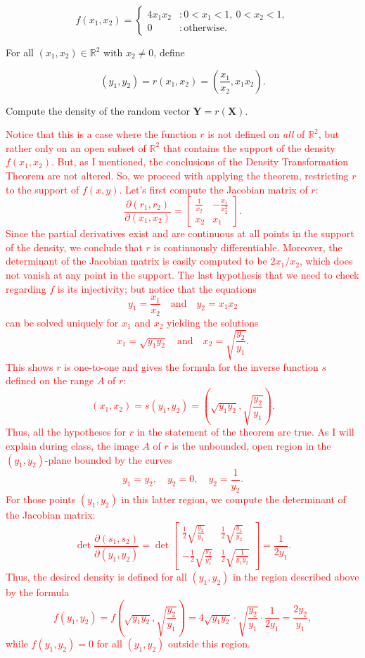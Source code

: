\documentclass[12pt,reqno]{amsart}
\begin{document}
	\[
	f(x_1,x_2) = \begin{cases}
	4x_1x_2 & : 0 < x_1 < 1, \ 0 < x_2 < 1, \\
	0 & : \text{otherwise}.
	\end{cases}
	\]

For all $(x_1,x_2) \in \mathbb{R}^2$ with $x_2 \neq 0$, define

	\[(y_1,y_2) = r(x_1,x_2) = \left( \frac{x_1}{x_2}, x_1x_2 \right).
	\]
	
Compute the density of the random vector $\mathbf{Y} = r(\mathbf{X})$.

\bigskip
\textcolor{red}{Notice that this is a case where the function $r$ is not defined on \textit{all} of $\mathbb{R}^2$, but rather only on an open subset of $\mathbb{R}^2$ that contains the support of the density $f(x_1,x_2)$. But, as I mentioned, the conclusions of the Density Transformation Theorem are not altered. So, we proceed with applying the theorem, restricting $r$ to the support of $f(x,y)$. Let's first compute the Jacobian matrix of $r$:
	\[\frac{\partial(r_1,r_2)}{\partial(x_1,x_2)} = \begin{bmatrix} \frac{1}{x_2} & - \frac{x_1}{x_2^2} \\ x_2 & x_1 \end{bmatrix}.
	\]
Since the partial derivatives exist and are continuous at all points in the support of the density, we conclude that $r$ is continuously differentiable. Moreover, the determinant of the Jacobian matrix is easily computed to be $2x_1/x_2$, which does not vanish at any point in the support. The last hypothesis that we need to check regarding $f$ is its injectivity; but notice that the equations
	\[y_1 = \frac{x_1}{x_2} \quad \text{and} \quad y_2 = x_1 x_2
	\]
can be solved uniquely for $x_1$ and $x_2$ yielding the solutions
	\[x_1 = \sqrt{y_1y_2} \quad \text{and} \quad x_2 = \sqrt{ \frac{y_2}{y_1}}.
	\]
This shows $r$ is one-to-one and gives the formula for the inverse function $s$ defined on the range $A$ of $r$:
	\[(x_1,x_2) = s(y_1,y_2) = \left( \sqrt{y_1y_2}, \sqrt{ \frac{y_2}{y_1}}\right).
	\]
Thus, all the hypotheses for $r$ in the statement of the theorem are true. As I will explain during class, the image $A$ of $r$ is the unbounded, open region in the $(y_1,y_2)$-plane bounded by the curves
	\[y_1 = y_2, \quad y_2 = 0, \quad y_2 = \frac{1}{y_2}.
	\]
For those points $(y_1,y_2)$ in this latter region, we compute the determinant of the Jacobian matrix:
	\[\det\frac{\partial(s_1,s_2)}{\partial (y_1,y_2)} = \det\begin{bmatrix}
	\frac{1}{2} \sqrt{\frac{y_2}{y_1}} & \frac{1}{2} \sqrt{\frac{y_1}{y_2}} \\
	-\frac{1}{2} \sqrt{ \frac{y_2}{y_1^3}} & \frac{1}{2} \sqrt{\frac{1}{y_1y_2}}
	\end{bmatrix} = \frac{1}{2y_1}.
	\]
Thus, the desired density is defined for all $(y_1,y_2)$ in the region described above by the formula
	\[f(y_1,y_2) = f\left( \sqrt{y_1y_2},\sqrt{\frac{y_2}{y_1}} \right) = 4\sqrt{y_1y_2}\cdot \sqrt{\frac{y_2}{y_1}}\cdot \frac{1}{2y_1} = \frac{2y_2}{y_1},
	\]
while $f(y_1,y_2) =0$ for all $(y_1,y_2)$ outside this region.}
\bigskip
\end{document}
